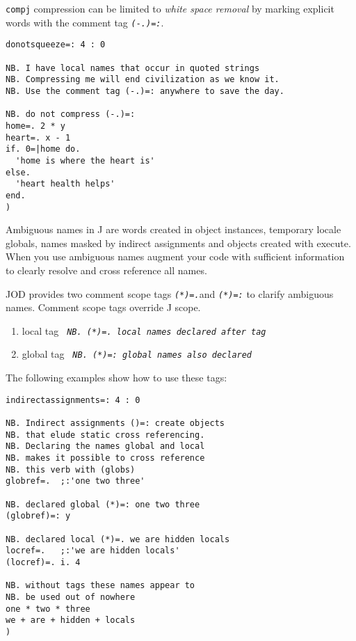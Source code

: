   \texttt{compj} compression can be limited to \emph{white space removal} by
  marking explicit words with the comment tag \textcolor{CodeComment}{\texttt{\textsl{(-.)=:}}}.

\begin{lstlisting}[frame=single,framerule=0pt]
donotsqueeze=: 4 : 0

NB. I have local names that occur in quoted strings
NB. Compressing me will end civilization as we know it.
NB. Use the comment tag (-.)=: anywhere to save the day.

NB. do not compress (-.)=:
home=. 2 * y
heart=. x - 1
if. 0=|home do.
  'home is where the heart is'
else.
  'heart health helps'
end.
)
\end{lstlisting}

  Ambiguous names in J are words created in object instances,
  temporary locale globals, names masked by indirect assignments and objects
  created with execute. When you use ambiguous names augment your code with
  sufficient information to clearly resolve and cross reference
   all names. 
  
  JOD provides two comment scope tags
   \textcolor{CodeComment}{\texttt{\textsl{(*)=.}}}and
  \textcolor{CodeComment}{\texttt{\textsl{(*)=:}}} to clarify ambiguous names.  Comment
  scope tags override J scope.  

\begin{enumerate}
	\item local tag \textcolor{CodeComment}{\texttt{\textsl{ NB. (*)=. local names declared after tag}}}
	\item global tag \textcolor{CodeComment}{\texttt{\textsl{ NB. (*)=: global names also declared}}}
\end{enumerate}
  
   The following examples show how to use these tags:

\begin{lstlisting}[frame=single,framerule=0pt]  
indirectassignments=: 4 : 0

NB. Indirect assignments ()=: create objects 
NB. that elude static cross referencing. 
NB. Declaring the names global and local
NB. makes it possible to cross reference 
NB. this verb with (globs)
globref=.  ;:'one two three'

NB. declared global (*)=: one two three
(globref)=: y     

NB. declared local (*)=. we are hidden locals
locref=.   ;:'we are hidden locals'
(locref)=. i. 4  

NB. without tags these names appear to
NB. be used out of nowhere 
one * two * three
we + are + hidden + locals
)
\end{lstlisting}

